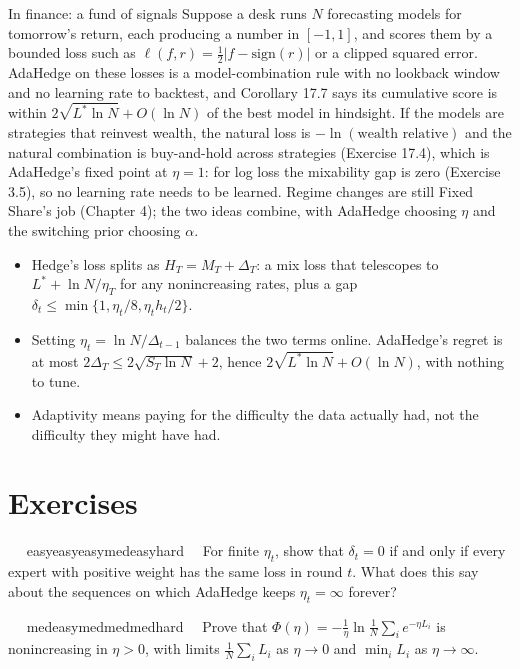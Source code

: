 \documentclass[11pt,a4paper,openany]{book}
\newcommand{\abs}[1]{\lvert #1\rvert}
\newcommand{\extag}[2]{%
  \def\tmp{#1}\def\tmpE{easy}\def\tmpM{med}\def\tmpH{hard}%
  \ifx\tmp\tmpE\def\tagc{defc}\else\ifx\tmp\tmpM\def\tagc{thmc}\else\ifx\tmp\tmpH\def\tagc{warnc}\else\def\tagc{finc}\fi\fi\fi
  \tcbox[on line,boxrule=0pt,arc=2pt,colback=\tagc!12,left=2pt,right=2pt,top=0pt,bottom=0pt,boxsep=1pt]{\sffamily\scriptsize\bfseries\color{\tagc}#2}}
\newcommand{\exercise}[3]{\par\medskip\noindent\textbf{\sffamily #1}\ \ #2\ \ #3\par}
\begin{document}
\begin{bfin}{In finance: a fund of signals}
Suppose a desk runs $N$ forecasting models for tomorrow's return, each producing a number in $[-1,1]$, and scores them by a bounded loss such as $\ell(f,r)=\tfrac12\abs{f-\mathrm{sign}(r)}$ or a clipped squared error. AdaHedge on these losses is a model-combination rule with no lookback window and no learning rate to backtest, and Corollary 17.7 says its cumulative score is within $2\sqrt{L^*\ln N}+O(\ln N)$ of the best model in hindsight. If the models are strategies that reinvest wealth, the natural loss is $-\ln(\text{wealth relative})$ and the natural combination is buy-and-hold across strategies (Exercise 17.4), which is AdaHedge's fixed point at $\eta=1$: for log loss the mixability gap is zero (Exercise 3.5), so no learning rate needs to be learned. Regime changes are still Fixed Share's job (Chapter 4); the two ideas combine, with AdaHedge choosing $\eta$ and the switching prior choosing $\alpha$.
\end{bfin}

\begin{takeaways}
\begin{itemize}
\item Hedge's loss splits as $H_T=M_T+\Delta_T$: a mix loss that telescopes to $L^*+\ln N/\eta_T$ for any nonincreasing rates, plus a gap $\delta_t\le\min\{1,\eta_t/8,\eta_th_t/2\}$.
\item Setting $\eta_t=\ln N/\Delta_{t-1}$ balances the two terms online. AdaHedge's regret is at most $2\Delta_T\le2\sqrt{S_T\ln N}+2$, hence $2\sqrt{L^*\ln N}+O(\ln N)$, with nothing to tune.
\item Adaptivity means paying for the difficulty the data actually had, not the difficulty they might have had.
\end{itemize}
\end{takeaways}

\section*{Exercises}\label{ch17-ex}

\exercise{17.1}{\extag{easy}{warm-up}}{\hypertarget{sol-17.1}{}For finite $\eta_t$, show that $\delta_t=0$ if and only if every expert with positive weight has the same loss in round $t$. What does this say about the sequences on which AdaHedge keeps $\eta_t=\infty$ forever?}

\exercise{17.2}{\extag{med}{core}}{\hypertarget{sol-17.2}{}Prove that $\Phi(\eta)=-\frac1\eta\ln\frac1N\sum_ie^{-\eta L_i}$ is nonincreasing in $\eta>0$, with limits $\frac1N\sum_iL_i$ as $\eta\to0$ and $\min_iL_i$ as $\eta\to\infty$.}
\end{document}
